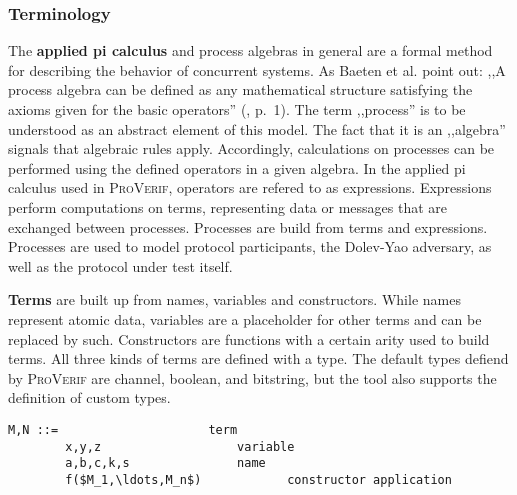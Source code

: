 \subsubsection{Terminology}

The \textbf{applied pi calculus} and process algebras in general are a formal method for describing the behavior of concurrent systems.
As Baeten et al. point out: ,,A process algebra can be defined as any mathematical structure satisfying the axioms given for the basic operators'' (\cite{baeten2007process}, p.~1).
The term ,,process'' is to be understood as an abstract element of this model.
The fact that it is an ,,algebra'' signals that algebraic rules apply.
Accordingly, calculations on processes can be performed using the defined operators in a given algebra.
In the applied pi calculus used in \textsc{ProVerif}, operators are refered to as expressions.
Expressions perform computations on terms, representing data or messages that are exchanged between processes.
Processes are build from terms and expressions.
Processes are used to model protocol participants, the Dolev-Yao adversary, as well as the protocol under test itself.

\textbf{Terms} are built up from names, variables and constructors.
While names represent atomic data, variables are a placeholder for other terms and can be replaced by such.
Constructors are functions with a certain arity used to build terms.
All three kinds of terms are defined with a type.
The default types defiend by \textsc{ProVerif} are \textsf{channel}, \textsf{boolean}, and \textsf{bitstring}, but the tool also supports the definition of custom types.


\begin{lstlisting}[caption={ProVerif term grammar, according to \cite{blanchet2016modeling}, p.~13},label={lst:pv-terms}]
    M,N ::=                     term
        x,y,z                   variable
        a,b,c,k,s               name
        f($M_1,\ldots,M_n$)            constructor application
\end{lstlisting}

